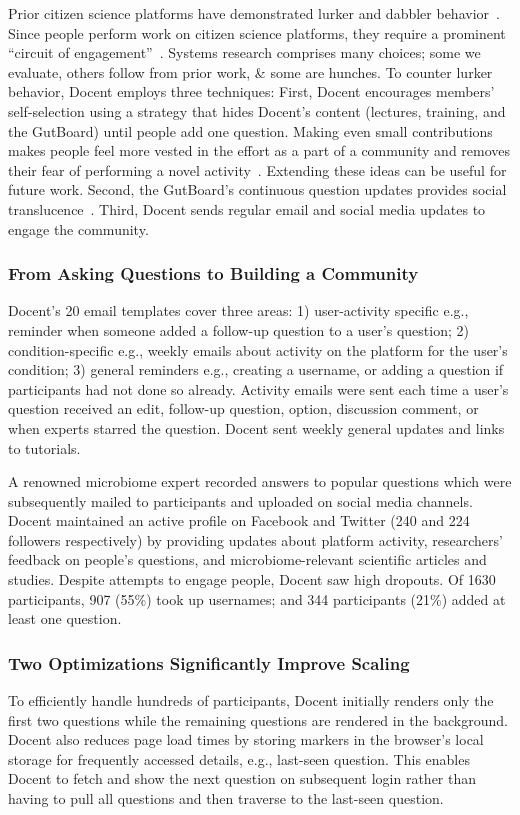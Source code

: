 Prior citizen science platforms have demonstrated lurker and dabbler behavior~\cite{Eveleigh2014}. Since people perform work on citizen science platforms, they require a prominent “circuit of engagement”~\cite{Rotman2012}. Systems research comprises many choices; some we evaluate, others follow from prior work, \& some are hunches. To counter lurker behavior, Docent employs three techniques: First, Docent encourages members’ self-selection using a strategy that hides Docent’s content (lectures, training, and the GutBoard) until people add one question. Making even small contributions makes people feel more vested in the effort as a part of a community and removes their fear of performing a novel activity~\cite{Resnick2011}. Extending these ideas can be useful for future work. Second, the GutBoard’s continuous question updates provides social translucence~\cite{Resnick2011}. Third, Docent sends regular email and social media updates to engage the community.

\subsubsection{From Asking Questions to Building a Community}
Docent’s 20 email templates cover three areas: 1) user-activity specific e.g., reminder when someone added a follow-up question to a user’s question; 2) condition-specific e.g., weekly emails about activity on the platform for the user’s condition; 3) general reminders e.g., creating a username, or adding a question if participants had not done so already. Activity emails were sent each time a user’s question received an edit, follow-up question, option, discussion comment, or when experts starred the question. Docent sent weekly general updates and links to tutorials.
 
A renowned microbiome expert recorded answers to popular questions which were subsequently mailed to participants and uploaded on social media channels. Docent maintained an active profile on Facebook and Twitter (240 and 224 followers respectively) by providing updates about platform activity, researchers’ feedback on people’s questions, and microbiome-relevant scientific articles and studies. Despite attempts to engage people, Docent saw high dropouts. Of 1630 participants, 907 (55\%) took up usernames; and 344 participants (21\%) added at least one question.

\subsubsection{Two Optimizations Significantly Improve Scaling}
To efficiently handle hundreds of participants, Docent initially renders only the first two questions while the remaining questions are rendered in the background. Docent also reduces page load times by storing markers in the browser’s local storage for frequently accessed details, e.g., last-seen question. This enables Docent to fetch and show the next question on subsequent login rather than having to pull all questions and then traverse to the last-seen question. 

